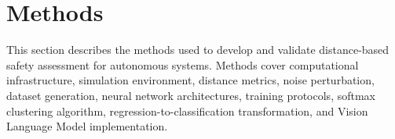 















\chapter{Methods}
\label{methods_final}

This section describes the methods used to develop and validate distance-based safety assessment for autonomous systems. Methods cover computational infrastructure, simulation environment, distance metrics, noise perturbation, dataset generation, neural network architectures, training protocols, softmax clustering algorithm, regression-to-classification transformation, and Vision Language Model implementation.


